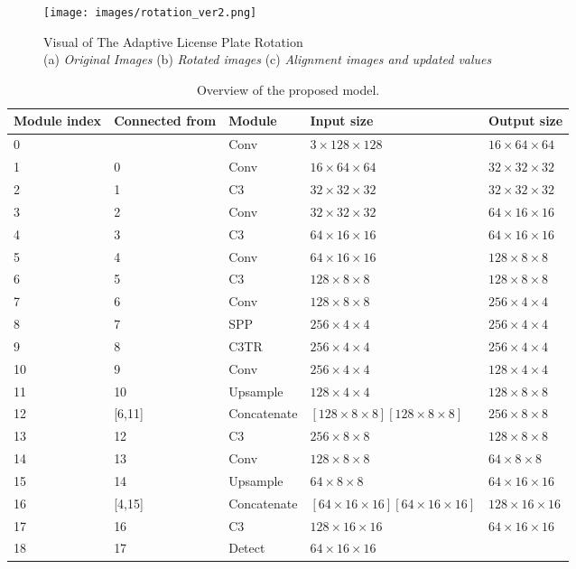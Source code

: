 \documentclass[conference]{IEEEtran}
\begin{document}
\begin{figure}[htp]
  \centering
    \texttt{[image: images/rotation\_ver2.png]}
  \caption{Visual of The Adaptive License Plate Rotation \\
    (a) \emph{Original Images} (b) \emph{Rotated images} (c) \emph{Alignment images and updated values} 
  }
  \label{rotation}
\end{figure}

\begin{table}[h!]
  \begin{center}
    \centering
    \caption{Overview of the proposed model.}
    \label{tab:table1}
\begin{tabular}{|p{8mm}|p{12mm}|p{13mm}|p{18mm}|p{16mm}|}
    \hline
      \textbf{Module index} & \textbf{Connected from} & \textbf{Module}& \textbf{Input size}& \textbf{Output size}\\
      \hline
      0 &   & Conv & $3\times128\times128$ & $16\times64\times64$\\
      1 & 0 & Conv & $16\times64\times64$ &$32\times32\times32$ \\
      2 & 1 & C3 & $32\times32\times32$ & $32\times32\times32$ \\
      3 & 2 & Conv &$32\times32\times32$ &$64\times16\times16$ \\
      4 & 3 & C3 &$64\times16\times16$ &$64\times16\times16$ \\
      5 & 4 & Conv &$64\times16\times16$ &$128\times8\times8$ \\
      6 & 5 & C3 &$128\times8\times8$ &$128\times8\times8$ \\
      7 & 6 & Conv &$128\times8\times8$ &$256\times4\times4$ \\
      8 & 7 & SPP &$256\times4\times4$ &$256\times4\times4$ \\
      9 & 8 & C3TR &$256\times4\times4$ &$256\times4\times4$ \\
      10 & 9 & Conv &$256\times4\times4$ &$128\times4\times4$ \\
      11 & 10 & Upsample &$128\times4\times4$ &$128\times8\times8$ \\
      12 & [6,11] & Concatenate & $[128\times8\times8]$\newline$[128\times8\times8]$ &$256\times8\times8$ \\
      13 & 12 & C3 &$256\times8\times8$ &$128\times8\times8$ \\
      14 & 13 & Conv &$128\times8\times8$ &$64\times8\times8$ \\
      15 & 14 & Upsample &$64\times8\times8$ &$64\times16\times16$ \\
      16 & [4,15] & Concatenate & $[64\times16\times16]$\newline$[64\times16\times16]$ &$128\times16\times16$ \\
      17 & 16 & C3 &$128\times16\times16$ &$64\times16\times16$ \\
      18 & 17 & Detect &$64\times16\times16$ & \\
      \hline
    \end{tabular}
    \label{table1}
  \end{center}
\end{table}
\end{document}
